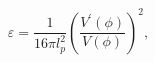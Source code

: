 \begin{equation}
\varepsilon =\frac{1}{16\pi l_{p}^{2}}\left( \frac{V^{\prime }\left( \phi
\right) }{V\left( \phi \right) }\right) ^{2},
\end{equation}


